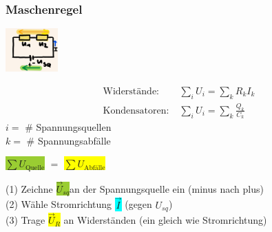     \subsubsection*{Maschenregel}
    \vspace{-1mm}
    \begin{minipage}{0.49\linewidth}
        \begin{footnotesize}
            \begin{center}
                \vspace{2mm}
                \includegraphics[width = 20mm]{src/images/maschenregel.png}
            \end{center}
        \end{footnotesize}
    \end{minipage}
    \begin{minipage}{0.5\linewidth}
        \begin{scriptsize}
            \begin{center}
                \begin{align*}
                    \text{Widerstände:} \; &\sum\limits_{i} U_{i} = \sum\limits_k R_k I_k \\
                    \text{Kondensatoren:} \; &\sum\limits_{i} U_{i} = \sum\limits_k \frac{Q_k}{C_k} 
                \end{align*}
                $i =$ \# Spannungsquellen\\
                $k =$ \# Spannungsabfälle
            \end{center}
            \vspace{1mm}
            \hfill \colorbox{YellowGreen}{$\sum U_\text{Quelle}$} $=$ \colorbox{Yellow}{$\sum U_\text{Abfälle}$} 
        \end{scriptsize}
    \end{minipage}
    \begin{scriptsize}
        (1) Zeichne \colorbox{YellowGreen}{$\vec{U}_{sq}$}an der Spannungsquelle ein (minus nach plus)
        \\(2) Wähle Stromrichtung \colorbox{Cyan}{$\vec{I}$} (gegen $U_{sq}$)
        \\(3) Trage \colorbox{Yellow}{$\vec{U}_R$} an Widerständen (ein gleich wie Stromrichtung)
    \end{scriptsize}